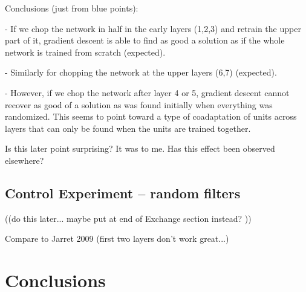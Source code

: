 Conclusions (just from blue points):

 - If we chop the network in half in the early layers (1,2,3) and retrain the upper part of it, gradient descent is able to find as good a solution as if the whole network is trained from scratch (expected).

 - Similarly for chopping the network at the upper layers (6,7) (expected).

 - However, if we chop the network after layer 4 or 5, gradient descent cannot recover as good of a solution as was found initially when everything was randomized. This seems to point toward a type of coadaptation of units across layers that can only be found when the units are trained together.

Is this later point surprising? It was to me. Has this effect been observed elsewhere?











\subsection{Control Experiment -- random filters}

((do this later... maybe put at end of Exchange section instead? ))

Compare to Jarret 2009 (first two layers don't work great...)
\cite{Jarrett-ICCV2009}








\section{Conclusions}

